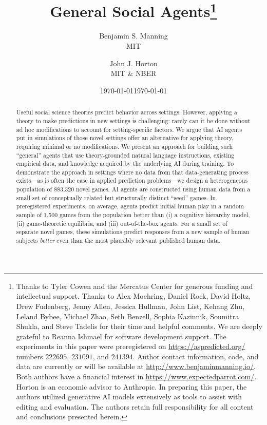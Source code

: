 \documentclass[11pt]{article}
\theoremstyle{definition}
\newcommand{\NGamesS}{1,500}
\newcommand{\TotalGames}{883,320}
\newcommand{\WorkingTitle}{General Social Agents}
\begin{document}
  
\date{\today}
\title{\WorkingTitle{}\thanks{
Thanks to Tyler Cowen and the Mercatus Center for generous funding and intellectual support.
Thanks to 
Alex Moehring,
Daniel Rock,
David Holtz,
Drew Fudenberg,
Jenny Allen,
Jessica Hullman,  
John List,
Kehang Zhu,
Leland Bybee,
Michael Zhao,
Seth Benzell,
Sophia Kazinnik,
Soumitra Shukla, and
Steve Tadelis
for their time and helpful comments.
We are deeply grateful to Reanna Ishmael for software development support.
The experiments in this paper were preregistered on \url{https://aspredicted.org/} numbers $222695$, $231091$, and $241394$.
Author contact information, code, and data are currently or will be available at \url{http://www.benjaminmanning.io/}. 
Both authors have a financial interest in \url{https://www.expectedparrot.com/}. Horton is an economic advisor to Anthropic.
In preparing this paper, the authors utilized generative AI models extensively as tools to assist with editing and evaluation. 
The authors retain full responsibility for all content and conclusions presented herein.
}
} 
\author{
Benjamin S. Manning \\ MIT  \and   
John J. Horton \\ MIT  \& NBER
}
\date{\today}

\maketitle

\vspace{-0.5cm}
\begin{abstract}

\noindent Useful social science theories predict behavior across settings. 
However, applying a theory to make predictions in new settings is challenging: rarely can it be done without ad hoc modifications to account for setting-specific factors.
We argue that AI agents put in simulations of those novel settings offer an alternative for applying theory, requiring minimal or no modifications.
We present an approach for building such ``general'' agents that use theory-grounded natural language instructions, existing empirical data, and knowledge acquired by the underlying AI during training.
To demonstrate the approach in settings where no data from that data-generating process exists---as is often the case in applied prediction problems---we design a heterogeneous population of \TotalGames{} novel games.
AI agents are constructed using human data from a small set of conceptually related but structurally distinct ``seed'' games.
In preregistered experiments, on average, agents predict initial human play in a random sample of \NGamesS{} games from the population better than (i) a cognitive hierarchy model, (ii) game-theoretic equilibria, and (iii) out-of-the-box agents.
For a small set of separate novel games, these simulations predict responses from a new sample of human subjects \emph{better} even than the most plausibly relevant published human data.
\end{abstract}
\end{document}

